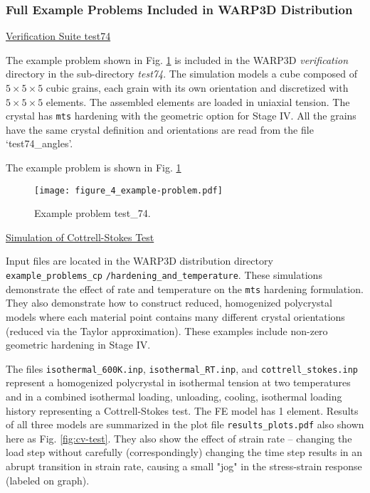 \documentclass[11pt]{report}
\numberwithin{equation}{section}
\newcommand{\ttt} {\texttt}  %
\newcommand{\ul} {\underline}
\newcommand{\ti}{\emph}
\newcommand{\noi}{\noindent}
\begin{document}
{\subsubsection{Full Example Problems Included in WARP3D Distribution}

\noi \ul{Verification Suite test74}

\noi The example problem shown in Fig. \ref{fig:test-problem}
is included in the WARP3D \ti{verification} directory in the sub-directory
\ti{test74}.  The simulation models a cube composed of $5\times5\times5$
cubic grains, each 
grain with its own orientation and discretized with $5\times5\times5$ elements. The
assembled elements are loaded in 
uniaxial tension.  The crystal has \ttt{mts} hardening with
the geometric option for Stage IV. All the grains have the same crystal definition and 
orientations are read from the file `test74\_angles'.

\noi The example problem is shown in Fig. \ref{fig:test-problem}



\begin{figure}
\begin{centering}
\texttt{[image: figure\_4\_example-problem.pdf]}
\par\end{centering}

\caption{\small Example problem test\_74. \normalsize \label{fig:test-problem}}
\end{figure}

\noi \ul{Simulation of Cottrell-Stokes Test}

\noi Input files are located in the WARP3D distribution directory\\ 
 \ttt{example\_problems\_cp} \ttt{/hardening\_and\_temperature}. These simulations demonstrate
the effect of rate and temperature on the  \ttt{mts}
hardening formulation.  They
also demonstrate how to construct reduced, homogenized polycrystal models where
each material point contains many different crystal orientations (reduced via
the Taylor approximation).  These examples include non-zero
geometric hardening in Stage IV.
 
 The files \ttt{isothermal\_600K.inp}, \ttt{isothermal\_RT.inp}, and
 \ttt{cottrell\_stokes.inp} represent a homogenized polycrystal in isothermal tension
 at two temperatures and in a combined isothermal loading, unloading, cooling,
 isothermal loading history representing a Cottrell-Stokes test.  The FE model has
 1 element. Results of
 all three models are summarized in the plot file  \ttt{results\_plots.pdf} also shown here as
 Fig. \ref{fig:cv-test}.   They also show the effect of strain rate --
 changing the load step without carefully (correspondingly) changing the time
 step results in an abrupt transition in strain rate, causing a small "jog" in
 the stress-strain response (labeled on graph).
 
}
\end{document}
